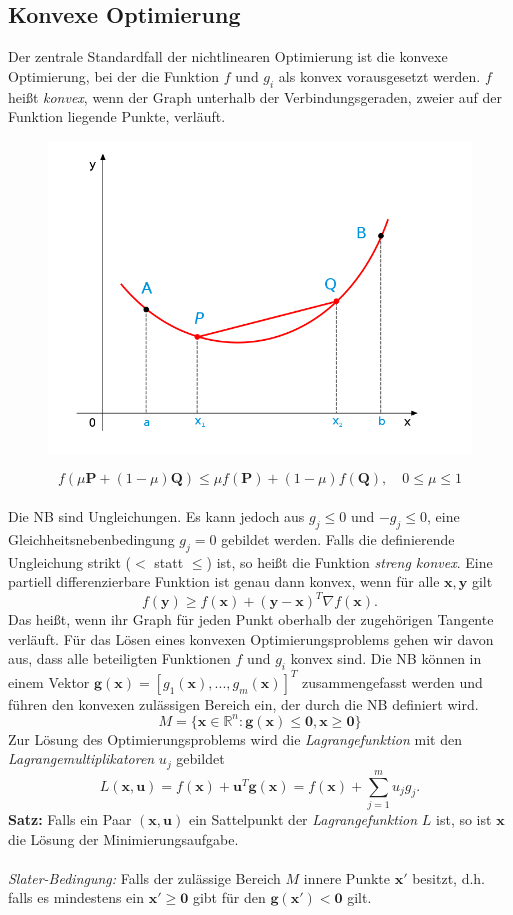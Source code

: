 	\subsection{Konvexe Optimierung}
		Der zentrale Standardfall der nichtlinearen Optimierung ist die konvexe Optimierung, bei der die Funktion $ f $ und $ g_{i} $ als konvex vorausgesetzt werden. $ f $ heißt \textit{konvex}, wenn der Graph unterhalb der Verbindungsgeraden, zweier auf der Funktion liegende Punkte, verläuft.
		\begin{figure}[h]
			\centering
			\includegraphics[width=0.3\linewidth]{./pics/ma/konvex}
		\end{figure}
		\[f(\mu \bm{P} + (1-\mu)\bm{Q}) \leq \mu f(\bm{P}) + (1-\mu)f(\bm{Q}), \quad 0\leq \mu \leq 1  \]
		\leavevmode \\
		Die NB sind Ungleichungen. Es kann jedoch aus $ g_{j} \leq 0 $ und $ -g_{j} \leq 0 $, eine Gleichheitsnebenbedingung $ g_{j} = 0 $ gebildet werden. Falls die definierende Ungleichung strikt ($ < $ statt $ \leq $) ist, so heißt die Funktion \textit{streng konvex}. Eine partiell differenzierbare Funktion ist genau dann konvex, wenn für alle $ \bm{x,y} $ gilt
		\[f(\bm{y}) \geq f(\bm{x}) + (\bm{y}-\bm{x})^{T}\nabla f(\bm{x}).\]
		Das heißt, wenn ihr Graph für jeden Punkt oberhalb der zugehörigen Tangente verläuft. Für das Lösen eines konvexen Optimierungsproblems gehen wir davon aus, dass alle beteiligten Funktionen $ f $ und $ g_{i} $ konvex sind. Die NB können in einem Vektor $ \bm{g(x)} = [g_{1}(\bm{x}), ..., g_{m}(\bm{x})]^{T} $ zusammengefasst werden und führen den konvexen zulässigen Bereich ein, der durch die NB definiert wird.
		\[M = \{\bm{x} \in \mathbb{R}^{n}: \bm{g(x)} \leq \bm{0}, \bm{x} \geq \bm{0}\}\]
		Zur Lösung des Optimierungsproblems wird die \textit{Lagrangefunktion} mit den \textit{Lagrangemultiplikatoren} $ u_{j} $ gebildet
		\[L(\bm{x},\bm{u}) = f(\bm{x}) + \bm{u}^{T}\bm{g}(\bm{x}) = f(\bm{x}) + \sum_{j=1}^{m}u_{j}g_{j}.\]
		\textbf{Satz:} Falls ein Paar $ (\bm{x,u}) $ ein Sattelpunkt der \textit{Lagrangefunktion} $ L $ ist, so ist $ \bm{x} $ die Lösung der Minimierungsaufgabe.\\\\
		\textit{Slater-Bedingung:} Falls der zulässige Bereich $ M $ innere Punkte $ \bm{x'} $ besitzt, d.h. falls es mindestens ein $ \bm{x'} \geq \bm{0}$ gibt für den $ \bm{g(x')} < \bm{0} $ gilt. \\\\
